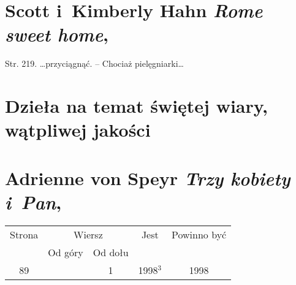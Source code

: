 \documentclass[a4paper,11pt]{article}
\numberwithin{equation}{section}
\begin{document}
\section{Scott i~Kimberly Hahn \textit{Rome sweet home},
  \parencite{}}





Str. 219. \ldots przyciągnąć. -- Chociaż pielęgniarki\ldots


\VerSpaceTwo










\newpage

\section{Dzieła na temat świętej wiary, wątpliwej jakości}

\VerSpaceTwo





\section{Adrienne von Speyr \textit{Trzy kobiety i~Pan},
  \cite{SpeyrTrzyKobietyIPan1998}}













\VerSpaceFive


\begin{center}

  \begin{tabular}{|c|c|c|c|c|}
    \hline
    Strona & \multicolumn{2}{c|}{Wiersz} & Jest
                              & Powinno być \\ \cline{2-3}
    & Od góry & Od dołu & & \\
    \hline
    89 & &  1 & 1998$^{ 3 }$ & 1998 \\
    \hline
  \end{tabular}

\end{center}
\end{document}
